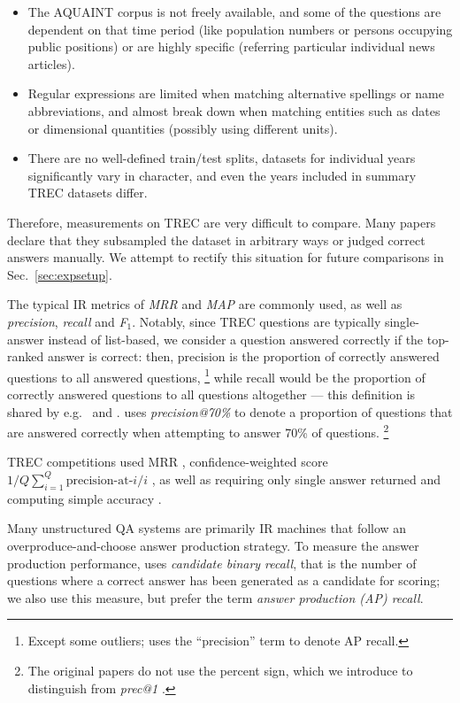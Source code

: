 \begin{itemize}
	\item The AQUAINT corpus is not freely available, and some of the questions are dependent on that time period (like population numbers or persons occupying public positions) or are highly specific (referring particular individual news articles).
	\item Regular expressions are limited when matching alternative spellings or name abbreviations, and almost break down when matching entities such as dates or dimensional quantities (possibly using different units).
	\item There are no well-defined train/test splits, datasets for individual years significantly vary in character, and even the years included in summary TREC datasets differ.
\end{itemize}

Therefore, measurements on TREC are very difficult to compare.  Many papers
declare that they subsampled the dataset in arbitrary ways or judged correct
answers manually.  We attempt to rectify this situation for future comparisons
in Sec.~\ref{sec:expsetup}.

The typical IR metrics of \textit{MRR} and \textit{MAP} are commonly
used, as well as \textit{precision}, \textit{recall} and \textit{F$_1$}.
Notably, since TREC questions are typically single-answer instead of list-based,
we consider a question answered correctly if the top-ranked answer is correct:
then, precision is the proportion of correctly answered questions to all
answered questions,%
\footnote{Except some outliers; \cite{Ephyra2006} uses the ``precision'' term
	to denote AP recall.}
while recall would be the proportion of correctly answered questions to all
questions altogether --- this definition is shared by
e.g.\ \cite{TreeEdit2013Yao} and \cite{QuASE}.
\cite{WatsonOverview} uses \textit{precision@70\%} to denote a proportion
of questions that are answered correctly when attempting to answer 70\% of questions.%
\footnote{The original papers do not use the percent sign, which we introduce
	to distinguish from \textit{prec@1} \citep{Semantic2014Bordes}.}

TREC competitions used MRR \citep{TREC8,TREC9,TREC10},
confidence-weighted score $1/Q \sum_{i=1}^Q \textrm{precision-at-$i$} / i$ \citep{TREC11},
as well as requiring only single answer returned and computing simple accuracy \citep{TREC12}.

Many unstructured QA systems are primarily IR machines that follow
an overproduce-and-choose answer production strategy.  To measure
the answer production performance, \cite{WatsonIR} uses \textit{candidate binary recall},
that is the number of questions where a correct answer has been generated as a candidate
for scoring;
we also use this measure, but prefer the term \textit{answer production (AP) recall}.


